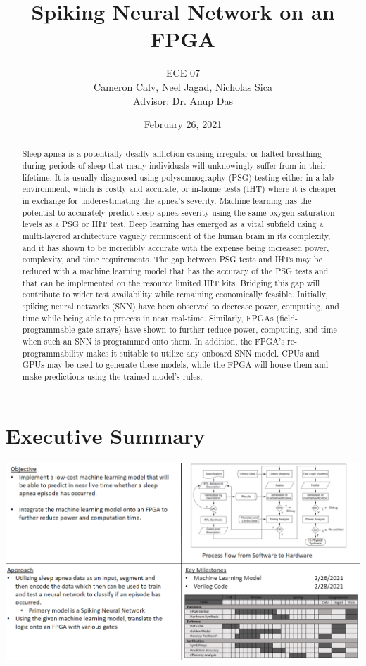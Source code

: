 \documentclass[12pt,titlepage]{article}
\title{Spiking Neural Network on an FPGA}
\author{ECE 07\\{\small{Cameron Calv, Neel Jagad, Nicholas Sica}}\\{\small{Advisor: Dr. Anup Das}}}
\date{February 26, 2021}
\begin{document}
\maketitle
\newpage
\clearpage
{}

\begin{abstract}
Sleep apnea is a potentially deadly affliction causing irregular or halted breathing during
	periods of sleep that many individuals will unknowingly suffer from in their lifetime. It 
	is usually diagnosed using polysomnography (PSG) testing either in a lab environment, which
	is costly and accurate, or in-home tests (IHT) where it is cheaper in exchange for underestimating
	the apnea’s severity. Machine learning has the potential to accurately predict sleep apnea severity
	using the same oxygen saturation levels as a PSG or IHT test. Deep learning has emerged as a vital
	subfield using a multi-layered architecture vaguely reminiscent of the human brain in its complexity,
	and it has shown to be incredibly accurate with the expense being increased power, complexity, and
	time requirements. The gap between PSG tests and IHTs may be reduced with a machine learning model
	that has the accuracy of the PSG tests and that can be implemented on the resource limited IHT kits.
	Bridging this gap will contribute to wider test availability while remaining economically feasible.
	Initially, spiking neural networks (SNN) have been observed to decrease power, computing, and time
	while being able to process in near real-time. Similarly, FPGAs (field-programmable gate arrays)
	have shown to further reduce power, computing, and time when such an SNN is programmed onto them. 
	In addition, the FPGA’s re-programmability makes it suitable to utilize any onboard SNN model. CPUs 
	and GPUs may be used to generate these models, while the FPGA will house them and make predictions 
	using the trained model’s rules. 
\end{abstract}

\tableofcontents

\listoffigures

\listoftables

\newpage

\section{Executive Summary}
\begin{table}[!htb]
	\label{tbl:quadchart}
	\includegraphics[width=\linewidth]{quadchart.png}
\end{table}
\end{document}
